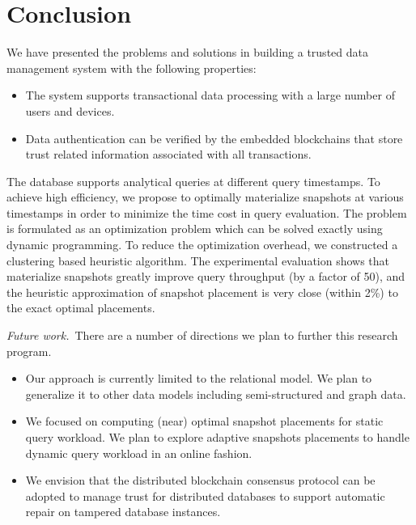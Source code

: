 \section{Conclusion}

We have presented the problems and solutions in building a trusted data
management system with the following properties:

\begin{itemize}
\item The system supports transactional data processing with a large number of users and devices.
\item Data authentication can be verified by the embedded blockchains that store
    trust related information associated with all transactions.
\end{itemize}

The database supports analytical
queries at different query timestamps.  To achieve high efficiency, we propose
to optimally materialize snapshots at various timestamps in order to
minimize the time cost in query evaluation.  The problem is formulated as
an optimization problem which can be solved exactly using dynamic
programming.  To reduce the optimization overhead, we constructed a clustering
based heuristic algorithm.  The experimental evaluation shows that materialize
snapshots greatly improve query throughput (by a factor of 50), and the
heuristic approximation of snapshot placement is very close (within 2\%) to the
exact optimal placements.

\medskip

{\em Future work.}\ There are a number of directions we plan to further this
research program.

\begin{itemize}
\item Our approach is currently limited to the relational model.  We plan to
generalize it to other data models including semi-structured and graph data.
\item We focused on computing (near) optimal snapshot placements for static
query workload.  We plan to explore adaptive snapshots placements to handle
dynamic query workload in an online fashion.
\item We envision that the
distributed blockchain consensus protocol can be adopted to manage trust for distributed
databases to support automatic repair on tampered database instances.
\end{itemize}
